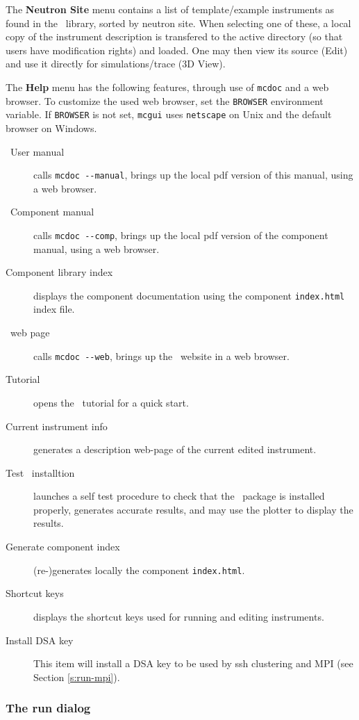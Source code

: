 \noindent The {\bf Neutron Site} menu contains a list of
template/example instruments as found in the \MCS\ library, sorted by
neutron site. When selecting one of these, a local copy of the
instrument description is transfered to the active directory (so that
users have modification rights) and loaded. One may then view its source (Edit) and use it directly for simulations/trace (3D View).

The {\bf Help} menu has the following features, through use of
\verb+mcdoc+ and a web browser. To customize the used web browser, set
the \verb+BROWSER+ environment variable. If \verb+BROWSER+ is not set,
\verb+mcgui+ uses \verb+netscape+ on Unix and the default browser on
Windows.
\begin{description}
\item[\MCS\ User manual] calls \verb+mcdoc --manual+, brings up the local
  pdf version of this manual, using a web browser.
\item[\MCS\ Component manual] calls \verb+mcdoc --comp+, brings up the local
  pdf version of the component manual, using a web browser.
\item[Component library index] displays the component documentation using
  the component \verb+index.html+ index file.
\item[\MCS\ web page] calls \verb+mcdoc --web+, brings up the \MCS\
  website in a web browser.
\item[Tutorial] opens the \MCS\ tutorial for a quick start.
\item[Current instrument info] generates a description web-page of the current edited instrument.
\item[Test \MCS\ installtion] launches a self test procedure to check that the \MCS\ package is installed properly, generates accurate results, and may use the plotter to display the results.
\item[Generate component index] (re-)generates locally the component \verb+index.html+.
\item[Shortcut keys] displays the shortcut keys used for running and editing instruments.
\item[Install DSA key] This item will install a DSA key to be used by ssh clustering and MPI (see Section \ref{s:run-mpi}).

\end{description}

\subsubsection{The run dialog}

